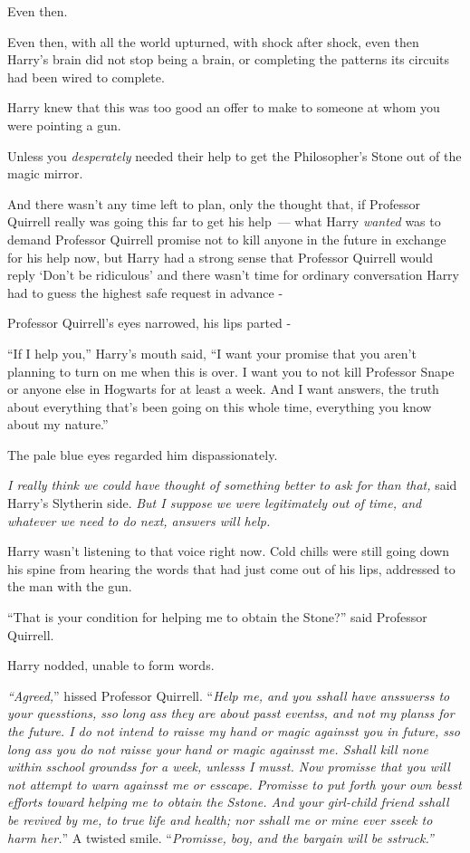 Even then.

Even then, with all the world upturned, with shock after shock, even then Harry's brain did not stop being a brain, or completing the patterns its circuits had been wired to complete.

Harry knew that this was too good an offer to make to someone at whom you were pointing a gun.

Unless you \emph{desperately} needed their help to get the Philosopher's Stone out of the magic mirror.

And there wasn't any time left to plan, only the thought that, if Professor Quirrell really was going this far to get his help~--- what Harry \emph{wanted} was to demand Professor Quirrell promise not to kill anyone in the future in exchange for his help now, but Harry had a strong sense that Professor Quirrell would reply `Don't be ridiculous' and there wasn't time for ordinary conversation Harry had to guess the highest safe request in advance -

Professor Quirrell's eyes narrowed, his lips parted -

``If I help you,'' Harry's mouth said, ``I want your promise that you aren't planning to turn on me when this is over. I want you to not kill Professor Snape or anyone else in Hogwarts for at least a week. And I want answers, the truth about everything that's been going on this whole time, everything you know about my nature.''

The pale blue eyes regarded him dispassionately.

\emph{I really think we could have thought of something better to ask for than that,} said Harry's Slytherin side. \emph{But I suppose we were legitimately out of time, and whatever we need to do next, answers will help.}

Harry wasn't listening to that voice right now. Cold chills were still going down his spine from hearing the words that had just come out of his lips, addressed to the man with the gun.

``That is your condition for helping me to obtain the Stone?'' said Professor Quirrell.

Harry nodded, unable to form words.

\emph{``Agreed,}'' hissed Professor Quirrell. ``\emph{Help me, and you sshall have ansswerss to your quesstions, sso long ass they are about passt eventss, and not my planss for the future. I do not intend to raisse my hand or magic againsst you in future, sso long ass you do not raisse your hand or magic againsst me. Sshall kill none within sschool groundss for a week, unlesss I musst. Now promisse that you will not attempt to warn againsst me or esscape. Promisse to put forth your own besst efforts toward helping me to obtain the Sstone. And your girl-child friend sshall be revived by me, to true life and health; nor sshall me or mine ever sseek to harm her.}'' A twisted smile. ``\emph{Promisse, boy, and the bargain will be sstruck.''}


